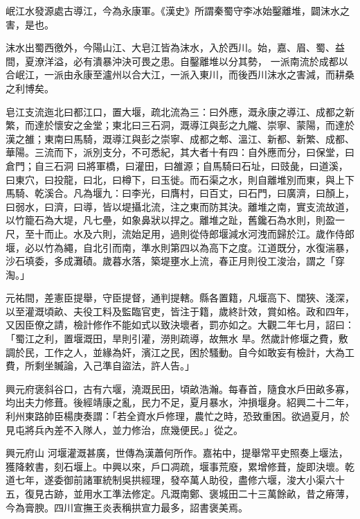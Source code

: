 \begin{pinyinscope}
 岷江水發源處古導江，今為永康軍。《漢史》所謂秦蜀守李冰始鑿離堆，闢沫水之害，是也。



 沫水出蜀西徼外，今陽山江、大皂江皆為沫水，入於西川。始，嘉、眉、蜀、益間，夏潦洋溢，必有潰暴沖決可畏之患。自鑿離堆以分其勢，
 一派南流於成都以合岷江，一派由永康至瀘州以合大江，一派入東川，而後西川沫水之害減，而耕桑之利博矣。



 皂江支流迤北曰都江口，置大堰，疏北流為三：曰外應，溉永康之導江、成都之新繁，而達於懷安之金堂；東北曰三石洞，溉導江與彭之九隴、崇寧、蒙陽，而達於漢之雒；東南曰馬騎，溉導江與彭之崇寧、成都之郫、溫江、新都、新繁、成都、華陽。三流而下，派別支分，不可悉紀，其大者十有四：自外應而分，曰保堂，曰倉門；自三石洞
 曰將軍橋，曰灌田，曰雒源；自馬騎曰石址，曰豉彘，曰道溪，曰東穴，曰投龍，曰北，曰樽下，曰玉徙。而石渠之水，則自離堆別而東，與上下馬騎、乾溪合。凡為堰九：曰李光，曰膺村，曰百丈，曰石門，曰廣濟，曰顏上，曰弱水，曰濟，曰導，皆以堤攝北流，注之東而防其決。離堆之南，實支流故道，以竹籠石為大堤，凡七壘，如象鼻狀以捍之。離堆之趾，舊鑱石為水則，則盈一尺，至十而止。水及六則，流始足用，過則從侍郎堰減水河洩而歸於江。歲作侍郎
 堰，必以竹為繩，自北引而南，準水則第四以為高下之度。江道既分，水復湍暴，沙石填委，多成灘磧。歲暮水落，築堤壅水上流，春正月則役工浚治，謂之「穿淘。」



 元祐間，差憲臣提舉，守臣提督，通判提轄。縣各置籍，凡堰高下、闊狹、淺深，以至灌溉頃畝、夫役工料及監臨官吏，皆注于籍，歲終計效，賞如格。政和四年，又因臣僚之請，檢計修作不能如式以致決壞者，罰亦如之。大觀二年七月，詔曰：「蜀江之利，置堰溉田，旱則引灌，澇則疏導，故無水
 旱。然歲計修堰之費，敷調於民，工作之人，並緣為奸，濱江之民，困於騷動。自今如敢妄有檢計，大為工費，所剩坐贓論，入己準自盜法，許人告。」



 興元府褒斜谷口，古有六堰，澆溉民田，頃畝浩瀚。每春首，隨食水戶田畝多寡，均出夫力修葺。後經靖康之亂，民力不足，夏月暴水，沖損堰身。紹興二十二年，利州東路帥臣楊庚奏謂：「若全資水戶修理，農忙之時，恐致重困。欲過夏月，於見屯將兵內差不入隊人，並力修治，庶幾便民。」從之。



 興元府山
 河堰灌溉甚廣，世傳為漢蕭何所作。嘉祐中，提舉常平史照奏上堰法，獲降敕書，刻石堰上。中興以來，戶口凋疏，堰事荒廢，累增修葺，旋即決壞。乾道七年，遂委御前諸軍統制吳拱經理，發卒萬人助役，盡修六堰，浚大小渠六十五，復見古跡，並用水工準法修定。凡溉南鄭、褒城田二十三萬餘畝，昔之瘠薄，今為膏腴。四川宣撫王炎表稱拱宣力最多，詔書褒美焉。



\end{pinyinscope}